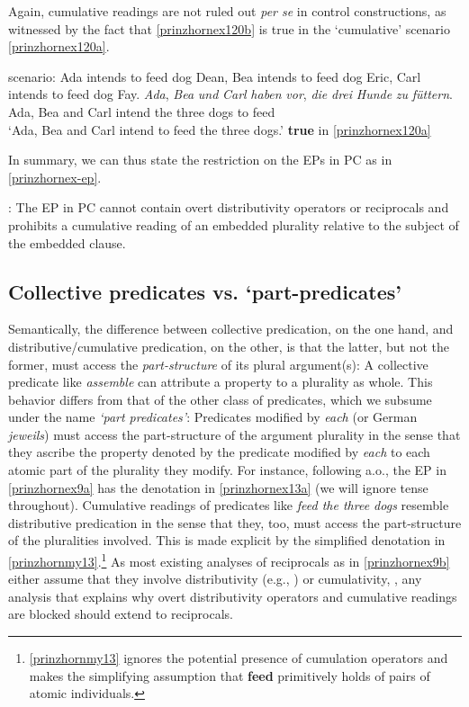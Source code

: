 \documentclass[output=paper,colorlinks,citecolor=brown,
]{langscibook}
\begin{document}
Again, cumulative readings are not ruled out \textit{per se} in control constructions, as witnessed by the fact that \ref{prinzhornex120b} is true in the `cumulative' scenario \ref{prinzhornex120a}.

\ea \label{prinzhornex120}
\ea \label{prinzhornex120a} {\sc scenario: }  Ada intends to feed dog Dean, Bea intends to feed dog Eric, Carl intends to feed dog Fay.
\ex \gll \textit{Ada}, \textit{Bea} \textit{und} \textit{Carl} \textit{haben} \textit{vor}, \textit{die} \textit{drei} \textit{Hunde}  \textit{zu} \textit{f\"{u}ttern}.\\
   Ada, Bea and Carl intend {} the three dogs  to feed \\
   \glt `Ada, Bea and Carl intend to feed the three dogs.' \hfill \textbf{true} in \ref{prinzhornex120a} \label{prinzhornex120b}
\z \z

In summary, we can thus state the restriction on the EPs in PC as in \ref{prinzhornex-ep}.  


:  The EP in PC cannot contain overt distributivity operators or reciprocals and prohibits a cumulative reading of an embedded plurality relative to the subject of the embedded clause. \label{prinzhornex-ep} \z

\subsection{Collective predicates vs. `part-predicates'}\label{prinzhornsec:2.2}

Semantically, the difference between collective predication, on the one hand,  and distributive/cumulative predication, on the other, is that the latter, but not the former, must access the {\it part-structure} of its plural argument(s): A collective predicate like {\it assemble} can attribute a property to a plurality as whole. This behavior differs from that of the other class of predicates, which we subsume under the name \textit{`part predicates'}:  Predicates modified by {\it each} (or German {\it jeweils}) must access the part-structure of the argument plurality in the sense that they ascribe the property denoted by the predicate modified by \textit{each} to each atomic part of the plurality they modify.  For instance, following \citealt{Link:1987} a.o., the EP in \ref{prinzhornex9a} has the denotation in \ref{prinzhornex13a} (we will ignore tense throughout). Cumulative readings of predicates like \textit{feed the three dogs} resemble distributive predication in the sense that they, too, must access the part-structure of the pluralities involved. This is made explicit by the simplified denotation in \ref{prinzhornmy13}.\footnote{\ref{prinzhornmy13} ignores the potential presence of cumulation operators and makes the simplifying assumption that {\bf feed} primitively holds of pairs of atomic individuals.} 
As most existing analyses of reciprocals as in \ref{prinzhornex9b} either assume that they involve distributivity (e.g., \citealt{Heim:1991}) or cumulativity, \citep{Beck:2001}, any analysis that explains why overt distributivity operators and cumulative readings are blocked should extend to reciprocals.
\end{document}
